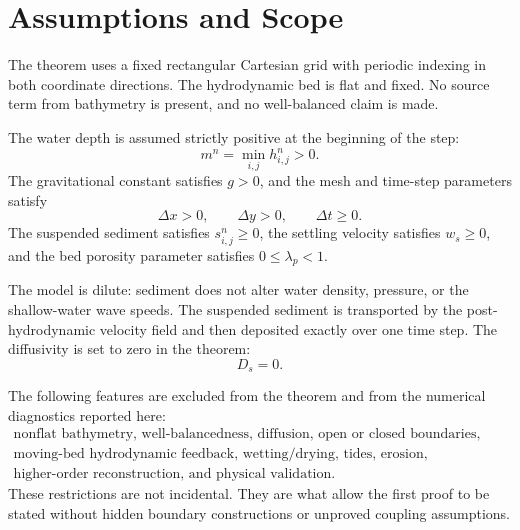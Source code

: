 \section{Assumptions and Scope}

The theorem uses a fixed rectangular Cartesian grid with periodic indexing in both coordinate directions. The hydrodynamic bed is flat and fixed. No source term from bathymetry is present, and no well-balanced claim is made.

The water depth is assumed strictly positive at the beginning of the step:
\[
  m^n = \min_{i,j} h_{i,j}^n > 0.
\]
The gravitational constant satisfies \(g>0\), and the mesh and time-step parameters satisfy
\[
  \Delta x>0,\qquad \Delta y>0,\qquad \Delta t\ge 0 .
\]
The suspended sediment satisfies \(s_{i,j}^n\ge 0\), the settling velocity satisfies \(w_s\ge 0\), and the bed porosity parameter satisfies \(0\le \lambda_p<1\).

The model is dilute: sediment does not alter water density, pressure, or the shallow-water wave speeds. The suspended sediment is transported by the post-hydrodynamic velocity field and then deposited exactly over one time step. The diffusivity is set to zero in the theorem:
\[
  D_s = 0.
\]

The following features are excluded from the theorem and from the numerical diagnostics reported here:
\[
\begin{gathered}
\text{nonflat bathymetry, well-balancedness, diffusion, open or closed boundaries,}\\
\text{moving-bed hydrodynamic feedback, wetting/drying, tides, erosion, resuspension,}\\
\text{higher-order reconstruction, and physical validation.}
\end{gathered}
\]
These restrictions are not incidental. They are what allow the first proof to be stated without hidden boundary constructions or unproved coupling assumptions.

